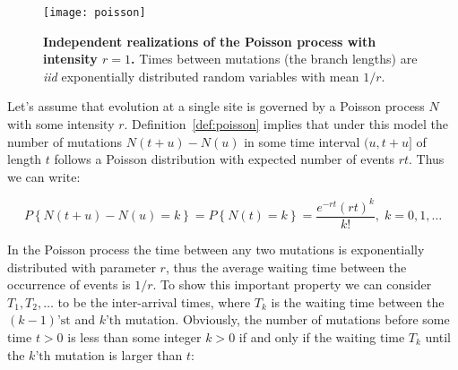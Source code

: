 \begin{figure}[H]
\centering
\texttt{[image: poisson]}
\caption{
{ \footnotesize 
{\bf Independent realizations of the Poisson process with intensity $r=1$.}
Times between mutations (the branch lengths) are \emph{iid} exponentially distributed random variables with mean $1/r$.
} %
}
\label{fig:poisson}
\end{figure}

Let's assume that evolution at a single site is governed by a Poisson process $N$ with some intensity $r$.
Definition~\ref{def:poisson} implies that under this model the number of mutations $N(t+u)-N(u)$ in some time interval $(u,t+u]$ of length $t$ follows a Poisson distribution with expected number of events $r t$.
Thus we can write:

\begin{equation}
P\left\{ N(t+u)-N(u)=k\right\} =P\left\{ N(t)=k\right\}=\frac{e^{-r t}(r t)^{k}}{k!},\; k=0,1,\ldots
\label{eq:poissonDist} 
\end{equation}

In the Poisson process the time between any two mutations is exponentially distributed with parameter $r$, thus the average waiting time between the occurrence of events is $1/r$.
To show this important property we can consider $T_1,T_2,\ldots$ to be the inter-arrival times, where $T_k$ is the waiting time between the $(k-1)\text{'st}$ and $k\text{'th}$ mutation. 
Obviously, the number of mutations before some time $t>0$ is less than some integer $k>0$ if and only if the waiting time $T_k$ until the $k\text{'th}$ mutation is larger than $t$:

